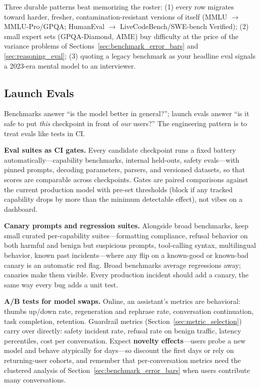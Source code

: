 Three durable patterns beat memorizing the roster: (1) every row migrates toward harder, fresher, contamination-resistant versions of itself (MMLU $\to$ MMLU-Pro/GPQA; HumanEval $\to$ LiveCodeBench/SWE-bench Verified); (2) small expert sets (GPQA-Diamond, AIME) buy difficulty at the price of the variance problems of Sections~\ref{sec:benchmark_error_bars} and \ref{sec:reasoning_eval}; (3) quoting a legacy benchmark as your headline eval signals a 2023-era mental model to an interviewer.

\subsection{Launch Evals}
\label{sec:launch_evals}

Benchmarks answer ``is the model better in general?''; launch evals answer ``is it safe to put \textit{this} checkpoint in front of \textit{our} users?'' The engineering pattern is to treat evals like tests in CI.

\textbf{Eval suites as CI gates.} Every candidate checkpoint runs a fixed battery automatically---capability benchmarks, internal held-outs, safety evals---with pinned prompts, decoding parameters, parsers, and versioned datasets, so that scores are comparable across checkpoints. Gates are paired comparisons against the current production model with pre-set thresholds (block if any tracked capability drops by more than the minimum detectable effect), not vibes on a dashboard.

\textbf{Canary prompts and regression suites.} Alongside broad benchmarks, keep small curated per-capability suites---formatting compliance, refusal behavior on both harmful and benign but suspicious prompts, tool-calling syntax, multilingual behavior, known past incidents---where any flip on a known-good or known-bad canary is an automatic red flag. Broad benchmarks average regressions away; canaries make them visible. Every production incident should add a canary, the same way every bug adds a unit test.

\textbf{A/B tests for model swaps.} Online, an assistant's metrics are behavioral: thumbs up/down rate, regeneration and rephrase rate, conversation continuation, task completion, retention. Guardrail metrics (Section~\ref{sec:metric_selection}) carry over directly: safety incident rate, refusal rate on benign traffic, latency percentiles, cost per conversation. Expect \textbf{novelty effects}---users probe a new model and behave atypically for days---so discount the first days or rely on returning-user cohorts, and remember that per-conversation metrics need the clustered analysis of Section~\ref{sec:benchmark_error_bars} when users contribute many conversations.

